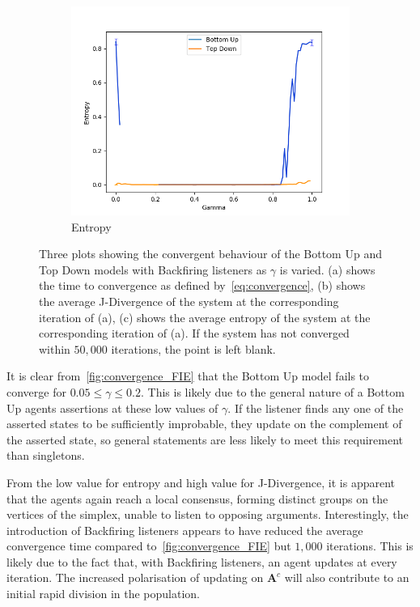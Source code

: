 \begin{figure}[H]
\begin{subfigure}[ht]{0.45\textwidth}
    \includegraphics[width=\textwidth]{Images/Figures/BU+TD/Spiteful/Entropy.png}
    \caption{Entropy}
 \end{subfigure}
 \caption{Three plots showing the convergent behaviour of the Bottom Up and Top Down models with Backfiring listeners as $\gamma$ is varied. (a) shows the time to convergence as defined by~\cref{eq:convergence}, (b) shows the average J-Divergence of the system at the corresponding iteration of (a), (c) shows the average entropy of the system at the corresponding iteration of (a). If the system has not converged within $50,000$ iterations, the point is left blank.}\label{fig:convergence_Spite}
\end{figure}


It is clear from~\cref{fig:convergence_FIE} that the Bottom Up model fails to converge for $0.05 \leq \gamma \leq 0.2$. This is likely due to the general nature of a Bottom Up agents assertions at these low values of $\gamma$. If the listener finds any one of the asserted states to be sufficiently improbable, they update on the complement of the asserted state, so general statements are less likely to meet this requirement than singletons.

From the low value for entropy and high value for J-Divergence, it is apparent that the agents again reach a local consensus, forming distinct groups on the vertices of the simplex, unable to listen to opposing arguments. Interestingly, the introduction of Backfiring listeners appears to have reduced the average convergence time compared to~\cref{fig:convergence_FIE} but $1,000$ iterations. This is likely due to the fact that, with Backfiring listeners, an agent updates at every iteration. The increased polarisation of updating on $\mathbf{A}^c$ will also contribute to an initial rapid division in the population. 





